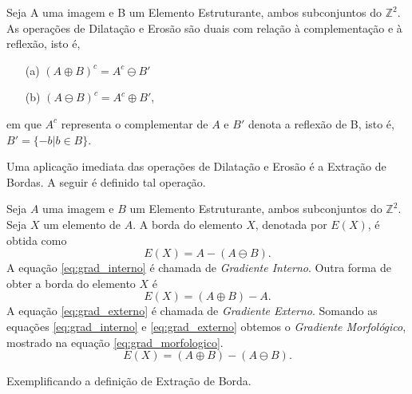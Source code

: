 \begin{propriedade}
	Seja A uma imagem e B um Elemento Estruturante, ambos subconjuntos do $\mathbb{Z}^2$. As operações de Dilatação e Erosão são duais com relação à complementação e à reflexão, isto é,
	\begin{enumerate}
		\item[(a)] $(A \oplus B)^c  = A^c \ominus B'$
		\item[(b)] $(A \ominus B)^c = A^c \oplus B' $,
	\end{enumerate}
	em que $A^c$ representa o complementar de $A$ e $B'$ denota a reflexão de B, isto é, $B' = \{ -b | b \in B\}$.
\end{propriedade}

Uma aplicação imediata das operações de Dilatação e Erosão é a Extração de Bordas. A seguir é definido tal operação.

\begin{define}
	Seja $A$ uma imagem e $B$ um Elemento Estruturante, ambos subconjuntos do $\mathbb{Z}^2$. Seja $X$ um elemento de $A$. A borda do elemento $X$, denotada por $E(X)$, é obtida como
	\begin{equation}
		E(X) = A - (A \ominus B).
		\label{eq:grad_interno}
	\end{equation}
	A equação \ref{eq:grad_interno} é chamada de \textit{Gradiente Interno}. Outra forma de obter a borda do elemento $X$ é
	\begin{equation}
		E(X) = (A \oplus B) - A.
		\label{eq:grad_externo}
	\end{equation}
	A equação \ref{eq:grad_externo} é chamada de \textit{Gradiente Externo}. Somando as equações \ref{eq:grad_interno} e \ref{eq:grad_externo} obtemos o \textit{Gradiente Morfológico}, mostrado na equação \ref{eq:grad_morfologico}.
	\begin{equation}
		E(X) = (A \oplus B) - (A \ominus B).
		\label{eq:grad_morfologico}
	\end{equation}
\end{define}

Exemplificando a definição de Extração de Borda.

